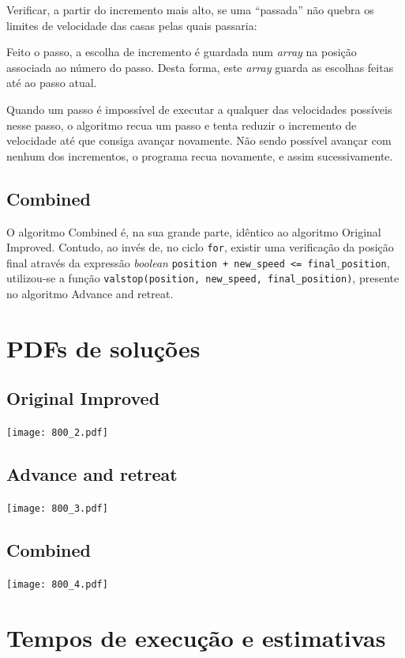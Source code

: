 \documentclass[portuguese,11pt,a4paper,titlepage]{article}
\newcommand{\extrang}[1]{\textit{#1}}
\newcommand{\srcdir}{..}
\begin{document}
Verificar, a partir do incremento mais alto, se uma ``passada'' não  quebra
os limites de velocidade das casas pelas quais passaria:


Feito o passo, a escolha de incremento é guardada num \extrang{array}
na posição associada ao número do passo. Desta forma, este \extrang{array}
guarda as escolhas feitas até ao passo atual.

Quando um passo é impossível de executar a qualquer das velocidades possíveis nesse
passo, o algoritmo recua um passo e tenta reduzir o incremento de velocidade até que
consiga avançar novamente. Não sendo possível avançar com nenhum dos incrementos,
o programa recua novamente, e assim sucessivamente.

\subsection{Combined}
O algoritmo Combined é, na sua grande parte, idêntico ao algoritmo Original Improved.
Contudo, ao invés de, no ciclo \verb#for#, existir uma verificação da posição final através da expressão \extrang{boolean}
\verb#position + new_speed <= final_position#,
utilizou-se a função \verb#valstop(position, new_speed, final_position)#, presente no algoritmo Advance and retreat.

\pagebreak

\section{PDFs de soluções}
\subsection{Original Improved}
\texttt{[image: 800\_2.pdf]}
\subsection{Advance and retreat}
\texttt{[image: 800\_3.pdf]}
\subsection{Combined}
\texttt{[image: 800\_4.pdf]}
\pagebreak

\section{Tempos de execução e estimativas}
\end{document}
